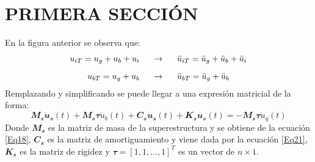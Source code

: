 \section{PRIMERA SECCIÓN}

En la figura anterior se observa que:
\begin{subequations}\label{Cap3_Eq1}
	\begin{gather}
		u_{iT}=u_{g}+u_{b}+u_{i} \hspace{5mm} \rightarrow \hspace{5mm} \ddot{u}_{iT}=\ddot{u}_{g}+\ddot{u}_{b}+\ddot{u}_{i}		\label{Cap3_Eq1_1} \\[2 mm]
		u_{bT}=u_{g}+u_{b}\hspace{5mm} \rightarrow \hspace{5mm} \ddot{u}_{bT}=\ddot{u}_{g}+\ddot{u}_{b} \label{Cap3_Eq1_2}
	\end{gather}
\end{subequations}
Remplazando y simplificando se puede llegar a una expresión matricial de la forma:
\begin{equation}\label{Cap3_Eq3}
	\mathbfit{M_{s}\ddot{u}_{s}}(t)+\mathbfit{M_{s}\tau}\ddot{u}_{b}(t)+\mathbfit{C_{s}\dot{u}_{s}}(t)+\mathbfit{K_{s}u_{s}}(t)=-\mathbfit{M_{s}\tau}\ddot{u}_{g}(t)
\end{equation}
Donde $\mathbfit{M_{s}}$ es la matriz de masa de la superestructura y se obtiene de la ecuación \ref{Eq18}, $\mathbfit{C_{s}}$ es la matriz de amortiguamiento y viene dada por la ecuación \ref{Eq21}, $\mathbfit{K_{s}}$ es la matriz de rigidez y $\mathbfit{\tau}=\left[1, 1,\ldots,1\right]^{T}$ es un vector de $n\times 1$.

